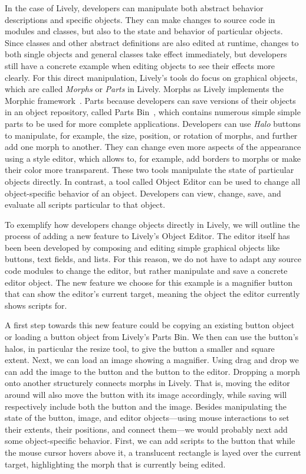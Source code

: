 In the case of Lively, developers can manipulate both abstract behavior descriptions and specific objects.
They can make changes to source code in modules and classes, but also to the state and behavior of particular objects.
Since classes and other abstract definitions are also edited at runtime, changes to both single objects and general classes take effect immediately, but developers still have a concrete example when editing objects to see their effects more clearly.
For this direct manipulation, Lively's tools do focus on graphical objects, which are called \emph{Morphs} or \emph{Parts} in Lively.
Morphs as Lively implements the Morphic framework~\cite{Maloney1995Mor}.
Parts because developers can save versions of their objects in an object repository, called Parts Bin~\cite{Lincke2012LPC}, which contains numerous simple simple parts to be used for more complete applications.
Developers can use \emph{Halo} buttons to manipulate, for example, the size, position, or rotation of morphs, and further add one morph to another.
They can change even more aspects of the appearance using a style editor, which allows to, for example, add borders to morphs or make their color more transparent.
These two tools manipulate the state of particular objects directly.
In contrast, a tool called Object Editor can be used to change all object-specific behavior of an object.
Developers can view, change, save, and evaluate all scripts particular to that object.


To exemplify how developers change objects directly in Lively, we will outline the process of adding a new feature to Lively's Object Editor.
The editor itself has been been developed by composing and editing simple graphical objects like buttons, text fields, and lists.
For this reason, we do not have to adapt any source code modules to change the editor, but rather manipulate and save a concrete editor object.
The new feature we choose for this example is a magnifier button that can show the editor's current target, meaning the object the editor currently shows scripts for.

A first step towards this new feature could be copying an existing button object or loading a button object from Lively's Parts Bin.
We then can use the button's halos, in particular the resize tool, to give the button a smaller and square extent.
Next, we can load an image showing a magnifier.
Using drag and drop we can add the image to the button and the button to the editor.
Dropping a morph onto another structurely connects morphs in Lively.
That is, moving the editor around will also move the button with its image accordingly, while saving will respectively include both the button and the image.
Besides manipulating the state of the button, image, and editor objects---using mouse interactions to set their extents, their positions, and connect them---we would probably next add some object-specific behavior.
First, we can add scripts to the button that while the mouse cursor hovers above it, a translucent rectangle is layed over the current target, highlighting the morph that is currently being edited.

